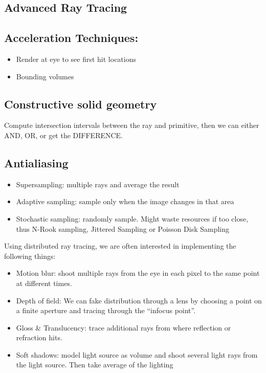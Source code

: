 \documentclass[a4paper]{article}
\begin{document}
\subsection{Advanced Ray Tracing}
\subsection*{Acceleration Techniques:}
\begin{itemize}
    \item Render at eye to see first hit locations
    \item Bounding volumes
\end{itemize}
\subsection*{Constructive solid geometry}
Compute intersection intervals between the ray and primitive, then we can either AND, OR, or get the DIFFERENCE.

\subsection*{Antialiasing}
\begin{itemize}
    \item Supersampling: multiple rays and average the result
    \item Adaptive sampling: sample only when the image changes in that area
    \item Stochastic sampling: randomly sample. Might waste resources if too close, thus N-Rook sampling, Jittered Sampling or Poisson Disk Sampling
\end{itemize}

Using distributed ray tracing, we are often interested in implementing the following things:

\begin{itemize}
    \item Motion blur: shoot multiple rays from the eye in each pixel to the same point at different times. 
    \item Depth of field: We can fake distribution through a lens by choosing a point on a
    finite aperture and tracing through the “infocus point”.
    \item Gloss \& Translucency: trace additional rays from where reflection or refraction hits.
    \item Soft shadows: model light source as volume and shoot several light rays from the light source. Then take average of the lighting
\end{itemize}
\end{document}
